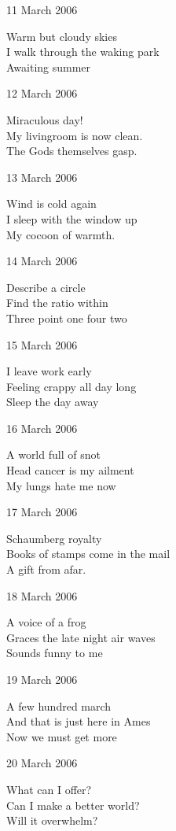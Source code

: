 \documentclass[12pt]{article}
\begin{document}
11 March 2006

Warm but cloudy skies \\
I walk through the waking park \\
Awaiting summer


12 March 2006

Miraculous day! \\
My livingroom is now clean. \\
The Gods themselves gasp.


13 March 2006

Wind is cold again \\
I sleep with the window up \\
My cocoon of warmth.


\newpage

14 March 2006

Describe a circle \\
Find the ratio within \\
Three point one four two


15 March 2006

I leave work early \\
Feeling crappy all day long \\
Sleep the day away


16 March 2006

A world full of snot \\
Head cancer is my ailment \\
My lungs hate me now


17 March 2006

Schaumberg royalty \\
Books of stamps come in the mail \\
A gift from afar.


18 March 2006

A voice of a frog \\
Graces the late night air waves \\
Sounds funny to me


19 March 2006

A few hundred march \\
And that is just here in Ames \\
Now we must get more


\newpage

20 March 2006

What can I offer? \\
Can I make a better world? \\
Will it overwhelm?
\end{document}

